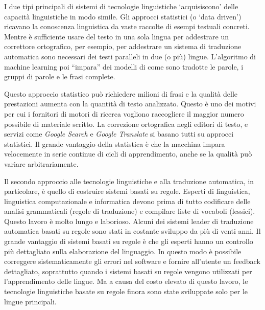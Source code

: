 \documentclass[]{../../metanetpaper}
\begin{document}
\begin{multicols}{2}

I due tipi principali di sistemi di tecnologie linguistiche ‘acquisiscono’
delle capacit\`{a} linguistiche in modo simile. Gli approcci statistici
(o ‘data driven’) ricavano la conoscenza linguistica da vaste raccolte di
esempi testuali concreti. Mentre \`{e} sufficiente usare del testo in una sola
lingua per addestrare un correttore ortografico, per esempio, per addestrare un
sistema di traduzione automatica sono necessari dei testi paralleli in due (o
pi\`{u}) lingue. L'algoritmo di machine learning poi “impara” dei modelli di
come sono tradotte le parole, i gruppi di parole e le frasi complete.


Questo approccio statistico pu\`{o} richiedere milioni di frasi e la
qualit\`{a} delle prestazioni aumenta con la quantit\`{a} di testo
analizzato. Questo \`{e} uno dei motivi per cui i fornitori di motori di
ricerca vogliono raccogliere il maggior numero possibile di materiale
scritto. La correzione ortografica negli editori di testo, e servizi come
\emph{Google Search} e \emph{Google Translate} si basano tutti su approcci
statistici. Il grande vantaggio della statistica \`{e} che la macchina impara
velocemente in serie continue di cicli di apprendimento, anche se la
qualit\`{a} pu\`{o} variare arbitrariamente.


Il secondo approccio alle tecnologie linguistiche e alla traduzione
automatica, in particolare, \`{e} quello di costruire sistemi basati su
regole. Esperti di linguistica, linguistica computazionale e informatica
devono prima di tutto codificare delle analisi grammaticali (regole di
traduzione) e compilare liste di vocaboli (lessici). Questo lavoro \`{e} molto
lungo e laborioso. Alcuni dei sistemi leader di traduzione automatica basati
su regole sono stati in costante sviluppo da pi\`{u} di venti anni. Il grande
vantaggio di sistemi basati su regole \`{e} che gli esperti hanno un controllo
pi\`{u} dettagliato sulla elaborazione del linguaggio. In questo modo \`{e}
possibile correggere sistematicamente gli errori nel software e fornire
all'utente un feedback dettagliato, soprattutto quando i sistemi basati su
regole vengono utilizzati per l'apprendimento delle lingue. Ma a causa del
costo elevato di questo lavoro, le tecnologie linguistiche basate su regole
finora sono state sviluppate solo per le lingue principali.



\end{multicols}
\end{document}
